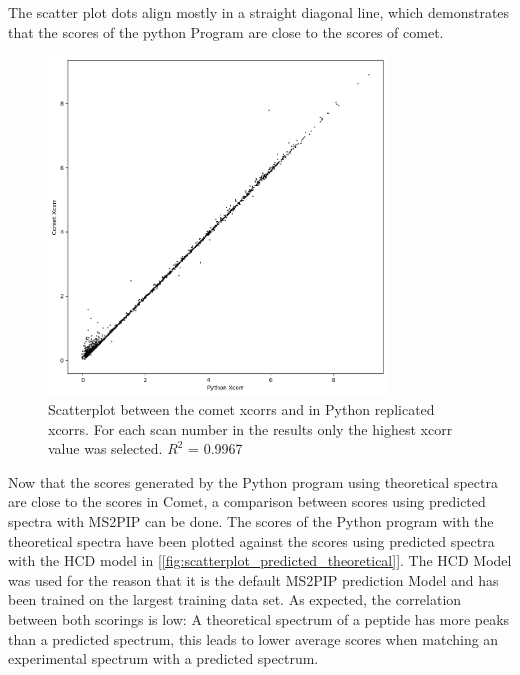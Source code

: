 \documentclass[11pt]{article}
\begin{document}
The scatter plot dots align mostly in a straight diagonal line, which demonstrates that the scores of the python Program are close to the scores of comet. 
\begin{figure}[ht]
\centering
\includegraphics[width=0.8\textwidth]{figs/scatterplot.png}
\caption{Scatterplot between the comet xcorrs and in Python replicated xcorrs. For each scan number in the results only the highest xcorr value was selected. \(R^2\) = 0.9967}
\label{fig:scatterplot}
\end{figure}

Now that the scores generated by the Python program using theoretical spectra are close to the scores in Comet, a comparison between scores using predicted spectra with MS2PIP can be done. The scores of the Python program with the theoretical spectra have been plotted against the scores using predicted spectra with the HCD model in [\cref{fig:scatterplot_predicted_theoretical}]. The HCD Model was used for the reason that it is the default MS2PIP prediction Model and has been trained on the largest training data set. As expected, the correlation between both scorings is low: A theoretical spectrum of a peptide has more peaks than a predicted spectrum, this leads to lower average scores when matching an experimental spectrum with a predicted spectrum.
\end{document}

